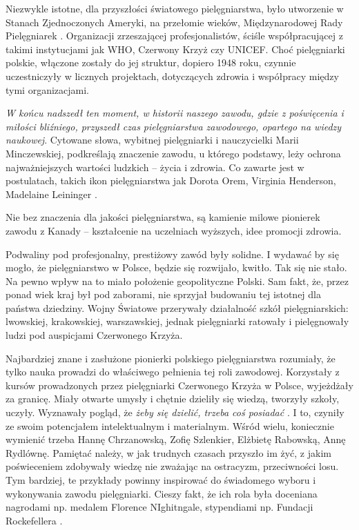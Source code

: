 \documentclass[a4paper,12pt,twoside,openright]{mwrep}
\begin{document}
Niezwykle istotne, dla przyszłości światowego pielęgniarstwa, było utworzenie w Stanach Zjednoczonych Ameryki, na przełomie wieków, Międzynarodowej Rady Pielęgniarek \cite{rada}. Organizacji zrzeszającej profesjonalistów, ściśle współpracującej z takimi instytucjami jak WHO, Czerwony Krzyż czy UNICEF. Choć pielęgniarki polskie, włączone zostały do jej struktur, dopiero 1948 roku, czynnie uczestniczyły w licznych projektach, dotyczących zdrowia i współpracy między tymi organizacjami.

\textit{W końcu nadszedł ten moment, w historii naszego zawodu, gdzie z poświęcenia i miłości bliźniego, przyszedł czas pielęgniarstwa zawodowego, opartego na wiedzy naukowej}. Cytowane słowa, wybitnej pielęgniarki i nauczycielki Marii Minczewskiej, podkreślają znaczenie zawodu, u którego podstawy, leży  ochrona najważniejszych wartości ludzkich – życia i zdrowia.  Co zawarte jest w postulatach, takich ikon pielęgniarstwa jak Dorota Orem, Virginia Henderson, Madelaine Leininger \cite{ikon}.

Nie bez znaczenia dla jakości pielęgniarstwa, są kamienie milowe pionierek zawodu z Kanady – kształcenie na uczelniach wyższych, idee promocji zdrowia.

Podwaliny pod profesjonalny, prestiżowy zawód były solidne. I wydawać by się mogło, że pielęgniarstwo w Polsce, będzie się rozwijało, kwitło. Tak się nie stało. Na pewno wpływ na to miało położenie geopolityczne Polski. Sam fakt, że, przez ponad wiek kraj był pod zaborami, nie sprzyjał budowaniu tej istotnej dla państwa dziedziny. Wojny Światowe przerywały działalność szkół pielęgniarskich: lwowskiej, krakowskiej, warszawskiej, jednak pielęgniarki ratowały i pielęgnowały ludzi pod auspicjami Czerwonego Krzyża.

Najbardziej znane i zasłużone pionierki polskiego pielęgniarstwa rozumiały, że tylko nauka prowadzi do właściwego pełnienia tej roli zawodowej. Korzystały z kursów prowadzonych przez pielęgniarki Czerwonego Krzyża  w Polsce, wyjeżdżały za granicę. Miały otwarte umysły i chętnie dzieliły się wiedzą, tworzyły szkoły, uczyły.  Wyznawały pogląd, że  \textit{żeby się dzielić, trzeba coś posiadać} \cite{ikonpol}. I to, czyniły ze swoim potencjałem intelektualnym i materialnym. Wśród wielu, koniecznie wymienić trzeba Hannę Chrzanowską, Zofię Szlenkier, Elżbietę Rabowską, Annę Rydlównę. Pamiętać należy, w jak trudnych czasach przyszło im żyć, z jakim poświeceniem zdobywały wiedzę nie zważając na ostracyzm, przeciwności losu. Tym bardziej, te przykłady powinny inspirować do świadomego wyboru i wykonywania zawodu pielęgniarki. Cieszy fakt, że ich rola była doceniana nagrodami np. medalem Florence NIghitngale, stypendiami np. Fundacji Rockefellera \cite{50}.
\end{document}
